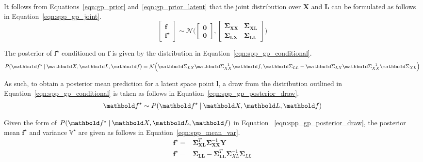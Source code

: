 It follows from Equations~\ref{eqn:gp_prior} and~\ref{eqn:gp_prior_latent} that 
the joint distribution over \( \bm{X} \) and \( \bm{L} \) can be formulated as 
follows in Equation~\ref{eqn:spp_gp_joint}.
\begin{equation}
  \label{eqn:spp_gp_joint}
  \begin{bmatrix}
    \bm{f}\\
    \bm{f}^{\star}
  \end{bmatrix}
  \sim \mathcal{N} \Bigg(
    \begin{bmatrix}
      \bm{0}\\
      \bm{0}
    \end{bmatrix},
    \begin{bmatrix}
      \bm{\Sigma}_{\bm{XX}} & \bm{\Sigma}_{\bm{XL}}\\
      \bm{\Sigma}_{\bm{LX}} & \bm{\Sigma}_{\bm{LL}}
    \end{bmatrix}
  \Bigg)
\end{equation}

The posterior of \( \bm{f}^{\star} \) conditioned on \( \bm{f} \) is given by
the distribution in Equation~\ref{eqn:spp_gp_conditional}.
\begin{equation}
  \label{eqn:spp_gp_conditional}
  P(\bm{f}^{\star} \given \bm{X}, \bm{L}, \bm{f}) = 
  \mathcal{N} \Big(
    \bm{\Sigma}_{LX} \bm{\Sigma}_{XX}^{-1} \bm{f}, 
    \bm{\Sigma}_{LL} - \bm{\Sigma}_{LX} \bm{\Sigma}_{XX}^{-1} \bm{\Sigma}_{XL}
  \Big) 
\end{equation}

As such, to obtain a posterior mean prediction for a latent space point \( \bm{l} \), 
a draw from the distribution outlined in Equation~\ref{eqn:spp_gp_conditional} is 
taken as follows in Equation~\ref{eqn:spp_gp_posterior_draw}.
\begin{equation}
  \label{eqn:spp_gp_posterior_draw}
  \bm{f}^{\star} \sim P(\bm{f}^{\star} \given \bm{X}, \bm{L}, \bm{f})
\end{equation}

Given the form of \( P(\bm{f}^{\star} \given \bm{X}, \bm{L}, \bm{f}) \) in Equation
~\ref{eqn:spp_gp_posterior_draw}, the posterior mean \( \bm{f}^{\star} \) and variance
\( \mathbb{V}^{\star} \) are given as follows in Equation~\ref{eqn:spp_mean_var}.
\begin{align}
  \label{eqn:spp_mean_var}
  \bm{f}^{\star} ={}& 
  \bm{\Sigma}_{\bm{XL}}^{T} \bm{\Sigma}_{\bm{XX}}^{-1} \bm{Y}\\
  \mathbb{\bm{f}^{\star}} ={}&
  \bm{\Sigma}_{\bm{LL}} - \bm{\Sigma}_{\bm{LL}}^{T} \bm{\Sigma}_{XL}^{-1} \bm{\Sigma}_{LL}
\end{align}

